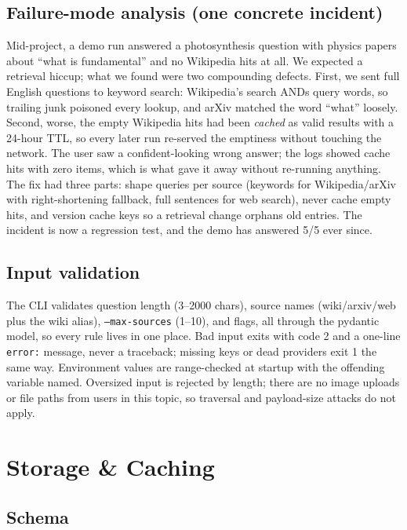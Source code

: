 \documentclass[11pt,a4paper]{article}
\begin{document}
\subsection{Failure-mode analysis (one concrete incident)}

Mid-project, a demo run answered a photosynthesis question with physics papers about ``what is fundamental'' and no Wikipedia hits at all. We expected a retrieval hiccup; what we found were two compounding defects. First, we sent full English questions to keyword search: Wikipedia's search ANDs query words, so trailing junk poisoned every lookup, and arXiv matched the word ``what'' loosely. Second, worse, the empty Wikipedia hits had been \emph{cached} as valid results with a 24-hour TTL, so every later run re-served the emptiness without touching the network. The user saw a confident-looking wrong answer; the logs showed cache hits with zero items, which is what gave it away without re-running anything. The fix had three parts: shape queries per source (keywords for Wikipedia/arXiv with right-shortening fallback, full sentences for web search), never cache empty hits, and version cache keys so a retrieval change orphans old entries. The incident is now a regression test, and the demo has answered 5/5 ever since.

\subsection{Input validation}

The CLI validates question length (3--2000 chars), source names (wiki/arxiv/web plus the wiki alias), \texttt{--max-sources} (1--10), and flags, all through the pydantic model, so every rule lives in one place. Bad input exits with code 2 and a one-line \texttt{error:} message, never a traceback; missing keys or dead providers exit 1 the same way. Environment values are range-checked at startup with the offending variable named. Oversized input is rejected by length; there are no image uploads or file paths from users in this topic, so traversal and payload-size attacks do not apply.

\section{Storage \& Caching}\label{sec:storage}

\subsection{Schema}
\end{document}
